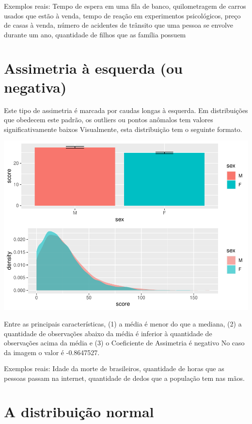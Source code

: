 \documentclass[
]{book}
\begin{document}
Exemplos reais: Tempo de espera em uma fila de banco, quilometragem de
carros usados que estão à venda, tempo de reação em experimentos
psicológicos, preço de casas à venda, número de acidentes de trânsito
que uma pessoa se envolve durante um ano, quantidade de filhos que as
família possuem

\hypertarget{assimetria-uxe0-esquerda-ou-negativa}{%
\section{Assimetria à esquerda (ou
negativa)}\label{assimetria-uxe0-esquerda-ou-negativa}}

Este tipo de assimetria é marcada por caudas longas à esquerda. Em
distribuições que obedecem este padrão, os outliers ou pontos anômalos
tem valores significativamente baixos Visualmente, esta distribuição tem
o seguinte formato.

\begin{center}\includegraphics{gitbook-demo_files/figure-latex/unnamed-chunk-38-1} \end{center}

Entre as principais características, (1) a média é menor do que a
mediana, (2) a quantidade de observações abaixo da média é inferior à
quantidade de observações acima da média e (3) o Coeficiente de
Assimetria é negativo No caso da imagem o valor é -0.8647527.

Exemplos reais: Idade da morte de brasileiros, quantidade de horas que
as pessoas passam na internet, quantidade de dedos que a população tem
nas mãos.

\hypertarget{a-distribuiuxe7uxe3o-normal}{%
\section{A distribuição normal}\label{a-distribuiuxe7uxe3o-normal}}
\end{document}
